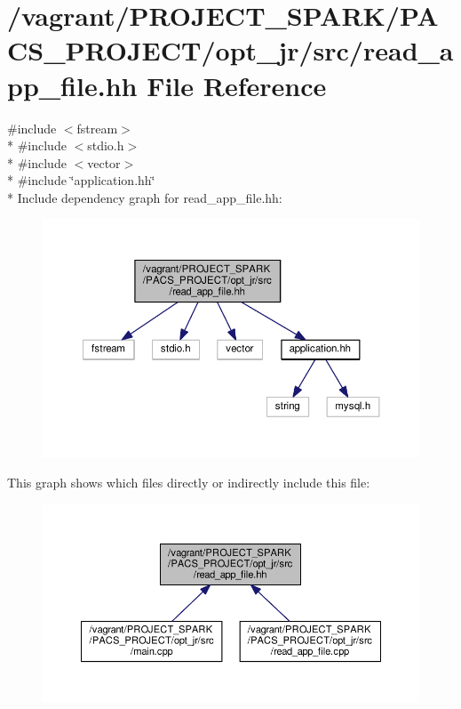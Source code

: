 \hypertarget{read__app__file_8hh}{\section{/vagrant/\-P\-R\-O\-J\-E\-C\-T\-\_\-\-S\-P\-A\-R\-K/\-P\-A\-C\-S\-\_\-\-P\-R\-O\-J\-E\-C\-T/opt\-\_\-jr/src/read\-\_\-app\-\_\-file.hh File Reference}
\label{read__app__file_8hh}
}
{\ttfamily \#include $<$fstream$>$}\\*
{\ttfamily \#include $<$stdio.\-h$>$}\\*
{\ttfamily \#include $<$vector$>$}\\*
{\ttfamily \#include \char`\"{}application.\-hh\char`\"{}}\\*
Include dependency graph for read\-\_\-app\-\_\-file.\-hh\-:
\nopagebreak
\begin{figure}[H]
\begin{center}
\leavevmode
\includegraphics[width=350pt]{read__app__file_8hh__incl}
\end{center}
\end{figure}
This graph shows which files directly or indirectly include this file\-:\nopagebreak
\begin{figure}[H]
\begin{center}
\leavevmode
\includegraphics[width=350pt]{read__app__file_8hh__dep__incl}
\end{center}
\end{figure}
